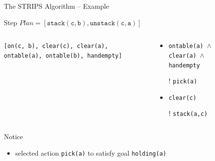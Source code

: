 \documentclass[presentation]{beamer}\mode<presentation>{\usetheme{AMSBolognaFC}}
\begin{document}
\begin{frame}[c]{The STRIPS Algorithm -- Example}
\small

\begin{exampleblock}{Step \nextStripsExampleStep{} \hfill $Plan = [\mathtt{stack(c,b),unstack(c,a)}]$}
	\begin{columns}[t]
		\begin{column}{.30\linewidth}\centering
			\texttt{[on(c, b), clear(c), clear(a), ontable(a), ontable(b), handempty]}
		\end{column}
		\begin{column}{.50\linewidth}\centering
			\begin{itemize}
				\item \texttt{ontable(a) $\wedge$ clear(a) $\wedge$ handempty}
				\item[!] \texttt{pick(a)}
				\item \texttt{clear(c)}
				\item[!] \texttt{stack(a,c)}
			\end{itemize}
		\end{column}
		\begin{column}{.10\linewidth}\centering
			
		\end{column}
	\end{columns}
\end{exampleblock}

\vfill

\footnotesize
Notice
\begin{itemize}\tiny
    \item selected action \texttt{pick(a)} to satisfy goal \texttt{holding(a)}
\end{itemize}

\end{frame}
\end{document}
